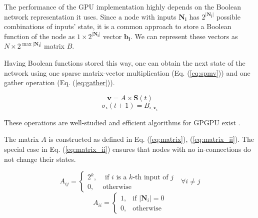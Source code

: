 \documentclass[procedia]{easychair}
\begin{document}
	The performance of the GPU implementation highly depends on the Boolean network representation it uses. Since a node with inputs \(\mathbf{N_i}\) has \(2^{|\mathbf{N_i}|}\) possible combinations of inputs' state, it is a common approach to store a Boolean function of the node as \(1 \times 2^{|\mathbf{N_i}|}\) vector \(\mathbf{b_i}\). We can represent these vectors as \(N \times 2^{\max{|\mathbf{N_i}|}}\) matrix \(B\).
	
	Having Boolean functions stored this way, one can obtain the next state of the network using one sparse matrix-vector multiplication (Eq. (\ref{eq:spmv})) and one gather operation (Eq. (\ref{eq:gather})).
	
	\begin{equation}
	\label{eq:spmv}
		\mathbf{v} = A \times \mathbf{S}(t)
	\end{equation}
	\begin{equation}
	\label{eq:gather}
		\sigma_i(t+1) = B_{i, \mathbf{v}_i}
	\end{equation}
	
	These operations are well-studied and efficient algorithms for GPGPU exist \cite{bell2008efficient}\cite{he2007efficient}.
	
	The matrix \(A\) is constructed as defined in Eq. (\ref{eq:matrix}), (\ref{eq:matrix_ii}). The special case in Eq. (\ref{eq:matrix_ii}) ensures that nodes with no in-connections do not change their states.
	
	\begin{equation}
		\label{eq:matrix}
		A_{ij} = \begin{cases}
			2^k, & \mbox{ if } i\mbox{ is a } k \mbox{-th input of } j \\
			0, & \mbox{otherwise}
		\end{cases} \mbox{  } \forall i \neq j
	\end{equation}
	\begin{equation}
	\label{eq:matrix_ii}
	A_{ii} = \begin{cases}
		1, & \mbox{if } |\mathbf{N}_i|=0\\
		0, & \mbox{otherwise}
		\end{cases}
	\end{equation}
	
\end{document}
